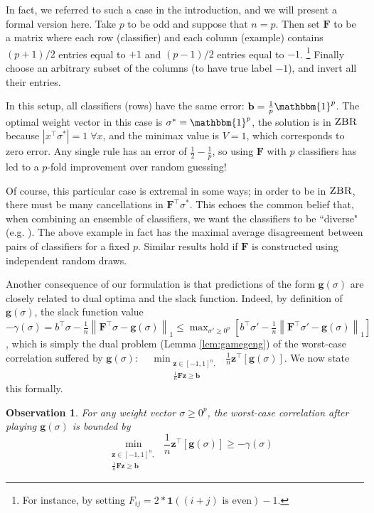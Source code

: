 \documentclass{colt2015} %
\newtheorem{obs}[thm]{Observation}
\newcommand{\ones}[1]{\mathbbm{1}^{#1}}
\newcommand{\vF}{\mathbf{F}}
\newcommand{\vb}{\mathbf{b}}
\newcommand{\vg}{\mathbf{g}}
\newcommand{\vz}{\mathbf{z}}
\newcommand{\vnorm}[1]{\left\lVert#1\right\rVert} %
\newcommand{\ifn}{\mathbf{1}} %
\newcommand{\abs}[1]{\left| #1 \right|}
\newcommand{\zbr}{\textsc{ZBR}}
\begin{document}
In fact, we referred to such a case in the introduction, 
and we will present a formal version here. 
Take $p$ to be odd and suppose that $n=p$. 
Then set $\vF$ to be a matrix where each row (classifier) and each column (example)
contains $(p+1)/2$ entries equal to $+1$ and $(p-1)/2$ entries equal to $-1$.
\footnote{For instance, by setting $F_{ij} = 2 * \ifn((i+j) \text{ is even}) - 1$.} 
Finally choose an arbitrary subset of the columns (to have true label $-1$), 
and invert all their entries. 

In this setup, all classifiers (rows) have the same error: $\vb= \frac{1}{p} \ones{p}$. 
The optimal weight vector in this case is $\sigma^*=\ones{p}$, 
the solution is in $\zbr$ because $\abs{x^\top \sigma^*} = 1 \;\forall x$, and the minimax value is $V=1$, 
which corresponds to zero error. 
Any single rule has an error of $\frac{1}{2} - \frac{1}{p}$, 
so using $\vF$ with $p$ classifiers has led to a $p$-fold improvement over random guessing!

Of course, this particular case is extremal in some ways; in order to be in $\zbr$, 
there must be many cancellations in $\vF^\top \sigma^*$. 
This echoes the common belief that, when combining an ensemble of classifiers, 
we want the classifiers to be ``diverse" (e.g. \cite{K03}). 
The above example in fact has the maximal average disagreement between pairs of classifiers for a fixed $p$. 
Similar results hold if $\vF$ is constructed using independent random draws.


Another consequence of our formulation 
is that predictions of the form $\vg (\sigma)$ 
are closely related to dual optima and the slack function. 
Indeed, by definition of $\vg (\sigma)$, the slack function value 
$ - \gamma (\sigma) = b^\top \sigma - \frac{1}{n} \vnorm{\vF^\top \sigma - \vg (\sigma)}_1 
\leq \max_{\sigma' \geq 0^p} \left[ b^\top \sigma' - \frac{1}{n} \vnorm{\vF^\top \sigma' - \vg (\sigma)}_1 \right]$, 
which is simply the dual problem (Lemma \ref{lem:gamegeng}) of the worst-case correlation suffered by $\vg (\sigma)$: 
$\displaystyle \quad \min_{\substack{ \vz \in [-1,1]^n , \\ \frac{1}{n} \vF \vz \geq \vb }} \;\frac{1}{n} \vz^\top [\vg (\sigma)]$. 
We now state this formally.

\begin{obs}
\label{obs:slacksubopt}
For any weight vector $\sigma \geq 0^p$, 
the worst-case correlation after playing $\vg (\sigma)$ is bounded by 
$$ \quad \min_{\substack{ \vz \in [-1,1]^n , \\ \frac{1}{n} \vF \vz \geq \vb }} \;\frac{1}{n} \vz^\top [\vg (\sigma)] 
\geq - \gamma (\sigma) $$
\end{obs}
\end{document}
